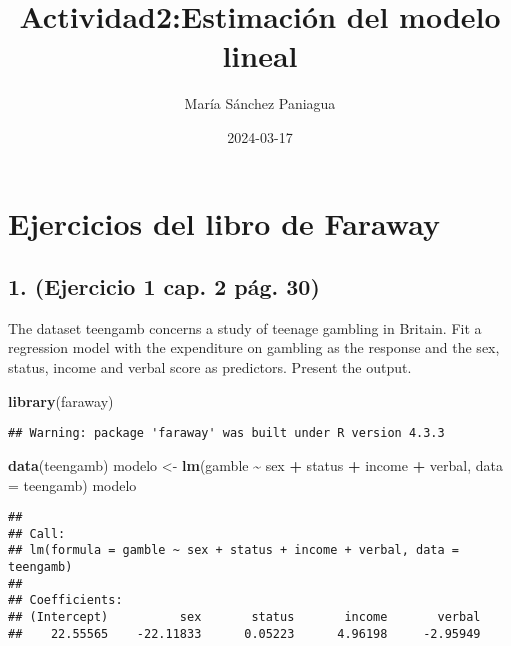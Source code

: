 \documentclass[
]{article}
\title{Actividad2:Estimación del modelo lineal}
\author{María Sánchez Paniagua}
\date{2024-03-17}
\newenvironment{Shaded}{\begin{snugshade}}{\end{snugshade}}
\newcommand{\AttributeTok}[1]{\textcolor[rgb]{0.13,0.29,0.53}{#1}}
\newcommand{\FunctionTok}[1]{\textcolor[rgb]{0.13,0.29,0.53}{\textbf{#1}}}
\newcommand{\NormalTok}[1]{#1}
\newcommand{\OtherTok}[1]{\textcolor[rgb]{0.56,0.35,0.01}{#1}}
\newcommand{\SpecialCharTok}[1]{\textcolor[rgb]{0.81,0.36,0.00}{\textbf{#1}}}
\begin{document}
\maketitle

\hypertarget{ejercicios-del-libro-de-faraway}{%
\section{Ejercicios del libro de
Faraway}\label{ejercicios-del-libro-de-faraway}}

\hypertarget{ejercicio-1-cap.-2-puxe1g.-30}{%
\subsection{1. (Ejercicio 1 cap. 2 pág.
30)}\label{ejercicio-1-cap.-2-puxe1g.-30}}

The dataset teengamb concerns a study of teenage gambling in Britain.
Fit a regression model with the expenditure on gambling as the response
and the sex, status, income and verbal score as predictors. Present the
output.

\begin{Shaded}
\begin{Highlighting}[]
\FunctionTok{library}\NormalTok{(faraway)}
\end{Highlighting}
\end{Shaded}

\begin{verbatim}
## Warning: package 'faraway' was built under R version 4.3.3
\end{verbatim}

\begin{Shaded}
\begin{Highlighting}[]
\FunctionTok{data}\NormalTok{(teengamb)}
\NormalTok{modelo }\OtherTok{\textless{}{-}} \FunctionTok{lm}\NormalTok{(gamble }\SpecialCharTok{\textasciitilde{}}\NormalTok{ sex }\SpecialCharTok{+}\NormalTok{ status }\SpecialCharTok{+}\NormalTok{ income }\SpecialCharTok{+}\NormalTok{ verbal, }\AttributeTok{data =}\NormalTok{ teengamb)}
\NormalTok{modelo}
\end{Highlighting}
\end{Shaded}

\begin{verbatim}
## 
## Call:
## lm(formula = gamble ~ sex + status + income + verbal, data = teengamb)
## 
## Coefficients:
## (Intercept)          sex       status       income       verbal  
##    22.55565    -22.11833      0.05223      4.96198     -2.95949
\end{verbatim}
\end{document}

